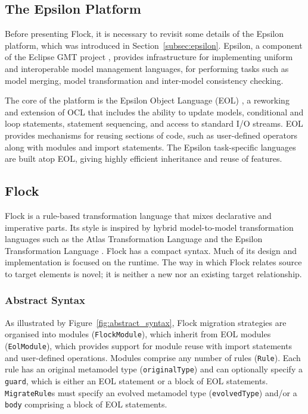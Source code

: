 \subsection{The Epsilon Platform}
Before presenting Flock, it is necessary to revisit some details of the Epsilon \cite{kolovos09thesis} platform, which was introduced in Section~\ref{subsec:epsilon}. Epsilon, a component of the Eclipse GMT project \cite{gmt}, provides infrastructure for implementing uniform and interoperable model management languages, for performing tasks such as model merging, model transformation and inter-model consistency checking. 

The core of the platform is the Epsilon Object Language (EOL) \cite{kolovos06eol}, a reworking and extension of OCL that includes the ability to update models, conditional and loop statements, statement sequencing, and access to standard I/O streams. EOL provides mechanisms for reusing sections of code, such as user-defined operators along with modules and import statements. The Epsilon task-specific languages are built atop EOL, giving highly efficient inheritance and reuse of features.

\subsection{Flock}
Flock is a rule-based transformation language that mixes declarative and imperative parts. Its style is inspired by hybrid model-to-model transformation languages such as the Atlas Transformation Language \cite{jouault05transforming} and the Epsilon Transformation Language \cite{kolovos08etl}. Flock has a compact syntax. Much of its design and implementation is focused on the runtime. The way in which Flock relates source to target elements is novel; it is neither a new nor an existing target relationship. 

\subsubsection{Abstract Syntax}
\label{subsubsec:abstract_syntax}
As illustrated by Figure~\ref{fig:abstract_syntax}, Flock migration strategies are organised into modules (\texttt{Fl\-ockMo\-du\-le}), which inherit from EOL modules (\texttt{Eo\-lMod\-ule}), which provides support for module reuse with import statements and user-defined operations. Modules comprise any number of rules (\texttt{Ru\-le}). Each rule has an original metamodel type (\texttt{or\-ig\-in\-alTy\-pe}) and can optionally specify a \texttt{gu\-ard}, which is either an EOL statement or a block of EOL statements. \texttt{Mi\-gr\-ateRu\-le}s must specify an evolved metamodel type (\texttt{ev\-ol\-vedTy\-pe}) and/or a \texttt{bo\-dy} comprising a block of EOL statements.

